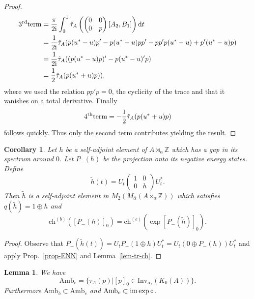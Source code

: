 \documentclass[11pt]{amsart}
\newtheorem{coro}[theorem]{Corollary}
\newtheorem{lemma}{Lemma}[section]
\newcommand{\Z}{\mathbb{Z}}
\newcommand{\chb}{\text{ch}^{(b)}}
\newcommand{\che}{\text{ch}^{(e)}}
\begin{document}
\begin{proof}
	\begin{align*}
		\mathrm{3\textsuperscript{rd} term}&= \frac{\pi}{2\mathrm{i}}\int_0^1\hat{\tau}_A\left( \begin{pmatrix}
			0 & 0\\ 0 & p
		\end{pmatrix} [A_2,B_1]\right)\mathrm{d}t\\ &= 
		\frac{1}{2\mathrm{i}}\hat{\tau}_A(p(u^*-u)p'-p(u^*-u)pp'-pp'p(u^*-u)+p'(u^*-u)p)\\
		&= \frac{1}{2\mathrm{i}}\hat{\tau}_A((p(u^*-u)p)'-p(u^*-u)'p)\\
		&= \frac{1}{2}\hat{\tau}_A(p(u^*+u)p)),
	\end{align*}
	where we used the relation $pp'p=0$, the cyclicity of the trace and that it vanishes on a total derivative. 
	Finally
	$$\mathrm{4\textsuperscript{th} term}=-\frac{1}{2}\hat{\tau}_A(p(u^*+u)p)$$
	follows quickly. Thus only the second term contributes yielding the result.
\end{proof}
\begin{coro}\label{cor-chb=che}
Let $h$ be a self-adjoint element of $A\rtimes_\alpha\Z$ which has a gap in its spectrum around $0$. Let $P_-(h)$ be the projection onto its negative energy states. Define 
$$\tilde h(t) = U_t \begin{pmatrix}
		1 & 0\\
		0 & h
	\end{pmatrix} U_t^*.$$
Then $\tilde h$ is a self-adjoint element in $M_2(M_{\bar{\alpha}}(A \rtimes_\alpha \mathbb{Z}))$ which satisfies $q(\tilde h)=1 \oplus h$ and
$$\chb([P_-(h)]_0) = \che(\exp[P_-(\tilde h)]_0).$$
\end{coro} 
\begin{proof}
Observe that $P_-(\tilde h(t)) = U_t P_-(1\oplus h) U^*_t = U_t(0 \oplus P_-(h))U^*_t$ and apply 
Prop.~\ref{prop-ENN} and Lemma~\ref{lem-tr-ch}.
\end{proof}
\begin{lemma}\label{lem-amb}
We have
	$$\mathrm{Amb}_e=
	\{\tau_A(p)|[p]_0\in \mathrm{Inv}_{\alpha_*} (K_0(A))\}.$$
	Furthermore $\mathrm{Amb}_b\subset \mathrm{Amb}_e$ and 
	$\mathrm{Amb}_e\subset \mathrm{im}\exp \circ \sc$.
\end{lemma}
\end{document}
